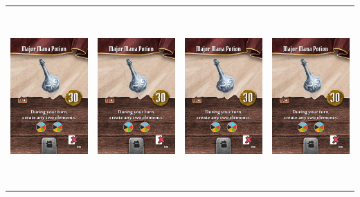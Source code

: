 \documentclass{minimal}
\begin{document}
{\begin{longtable}{llll}
\includegraphics[width=44mm,height=68mm]{./43-49/gh-048-major-mana-potion.png} &
\includegraphics[width=44mm,height=68mm]{./43-49/gh-048-major-mana-potion.png} &
\includegraphics[width=44mm,height=68mm]{./43-49/gh-048-major-mana-potion.png} &
\includegraphics[width=44mm,height=68mm]{./43-49/gh-048-major-mana-potion.png}\\ 

\end{longtable}}
\end{document}
